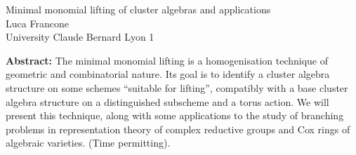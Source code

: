 \documentclass[12pt,a4paper]{article}
\begin{document}
\thispagestyle{empty} 
\begin{center}
{\large   Minimal monomial lifting of cluster algebras and applications}\\
\vspace*{.5cm}
Luca Francone\\
University Claude Bernard Lyon 1\\
\end{center}
\vspace*{.8cm}

{\bf Abstract:} The minimal monomial lifting is a homogenisation technique of geometric and combinatorial nature. Its goal is to identify a cluster algebra structure on some schemes ``suitable for lifting'', compatibly with a base cluster algebra structure on a distinguished subscheme and a torus action. We will present this technique, along with some applications to the study of branching problems in representation theory of complex reductive groups and Cox rings of algebraic varieties. (Time permitting).
\end{document}
